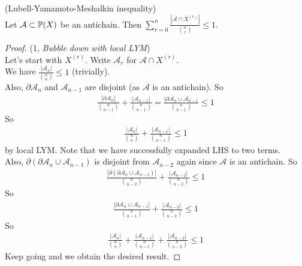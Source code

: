 \documentclass[a4paper]{article}
\begin{document}
\begin{thm} (Lubell-Yamamoto-Meshalkin inequality)\\
    Let $\mathcal{A} \subset \P(X)$ be an antichain. Then $\sum_{r=0}^n \frac{|\mathcal{A} \cap X^{(r)}|}{{n \choose r}} \leq 1$.
    \begin{proof} (1, \emph{Bubble down with local LYM})\\
        Let's start with $X^{(r)}$. Write $\mathcal{A}_r$ for $\mathcal{A} \cap X^{(r)}$.\\
        We have $\frac{|\mathcal{A}_n|}{{n\choose n}} \leq 1$ (trivially).\\
        Also, $\partial \mathcal{A}_n$ and $\mathcal{A}_{n-1}$ are disjoint (as $\mathcal{A}$ is an antichain). So 
        \begin{equation*}
        \begin{aligned}
            \frac{|\partial \mathcal{A}_n|}{{n \choose {n-1}}} + \frac{|\mathcal{A}_{n-1}|}{{n \choose {n-1}}} = \frac{|\partial \mathcal{A}_n \cup \mathcal{A}_{n-1}}{{n \choose {n-1}}} \leq 1
        \end{aligned}
        \end{equation*}
        So
        \begin{equation*}
        \begin{aligned}
            \frac{|\mathcal{A}_n|}{{n \choose n}} + \frac{|\mathcal{A}_{n-1}|}{{n \choose {n-1}}} \leq 1
        \end{aligned}
        \end{equation*}
        by local LYM. Note that we have successfully expanded LHS to two terms.\\
        Also, $\partial (\partial \mathcal{A}_n \cup \mathcal{A}_{n-1})$ is disjoint from $\mathcal{A}_{n-2}$ again since $\mathcal{A}$ is an antichain. So 
        \begin{equation*}
            \begin{aligned}
                \frac{|\partial(\partial \mathcal{A}_n \cup \mathcal{A}_{n-1})|}{{n \choose {n-2}}} + \frac{|\mathcal{A}_{n-2}|}{{n \choose {n-2}}} \leq 1
            \end{aligned}
        \end{equation*}
        So
        \begin{equation*}
            \begin{aligned}
                \frac{|\partial \mathcal{A}_n \cup \mathcal{A}_{n-1}|}{{n \choose {n-1}}} + \frac{|\mathcal{A}_{n-2}|}{{n \choose {n-2}}} \leq 1
            \end{aligned}
        \end{equation*}
        So
        \begin{equation*}
            \begin{aligned}
                \frac{|\mathcal{A}_n|}{{n \choose {n}}} + \frac{|\mathcal{A}_{n-1}|}{{n \choose {n-1}}} + \frac{|\mathcal{A}_{n-2}|}{{n \choose {n-2}}} \leq 1
            \end{aligned}
        \end{equation*}
        Keep going and we obtain the desired result.
    \end{proof}
\end{thm}
\end{document}
